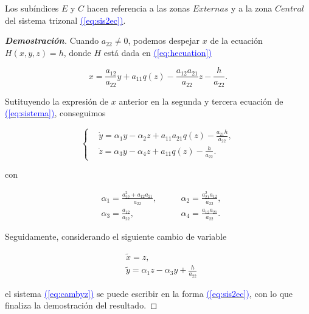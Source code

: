 \documentclass[12pt,a4paper]{report} %
\newcommand{\eref}[1]{\hyperref[#1]{\textcolor{blue}{(\ref*{#1})}}}
\newcommand{\eref}[1]{\hyperref[#1]{\textcolor{blue}{\textit{(\ref*{#1})}}}}
\begin{document}
 \vspace{0.5cm} Los subíndices $E$ y $C$ hacen referencia a las zonas $Externas$ y a la zona $Central$ del sistema trizonal \eref{eq:sis2ec}.
	
	\vspace{0.5cm}
		
	\begin{proof}[\textbf{Demostración}]
		 Cuando $a_{22}\neq0$, podemos despejar $x$ de la ecuación $H(x,y,z)=h$, donde $H$ está dada en \eref{eq:hecuation}
		
		\begin{equation}
			\label{eq:xeqn}
			x=\frac{a_{12}}{a_{22}}y+a_{11}q(z)-\frac{a_{12}a_{21}}{a_{22}}z-\frac{h}{a_{22}}.
		\end{equation}\smallskip
		
		\noindent Sutituyendo la expresión de $x$ anterior en la segunda y tercera ecuación de \eref{eq:sistema}, conseguimos
		
		\begin{equation}
			\label{eq:cambyz}
			\left\{
			\begin{aligned}
				&\dot{y}=\alpha_1y-\alpha_2z+a_{11}a_{21}q(z)-\frac{a_{21}h}{a_{22}}, \\[2mm]
				&\dot{z}=\alpha_3y-\alpha_4z+a_{11}q(z)-\frac{h}{a_{22}}.
			\end{aligned}
			\right.
		\end{equation}
		
	    \noindent con
		
		\begin{equation}
			\label{eq:alphamatriz}
			\begin{aligned}
				&\alpha_1=\frac{a_{22}^2+a_{12}a_{21}}{a_{22}}, \qquad &\alpha_2=\frac{a_{21}^2a_{12}}{a_{22}},\\[2mm]
				&\alpha_3=\frac{a_{12}}{a_{22}}, \qquad &\alpha_4=\frac{a_{12}a_{21}}{a_{22}}.
			\end{aligned}
		\end{equation}\smallskip
		
		\noindent Seguidamente, considerando el siguiente cambio de variable
		
		\begin{equation}
			\label{eq:xytilde}
			\begin{aligned}
				&\tilde{x}=z, \\[2mm]
				&\tilde{y}=\alpha_1z-\alpha_3y+\frac{h}{a_{22}}
			\end{aligned}
		\end{equation}\smallskip
		
		 \noindent el sistema \eref{eq:cambyz} se puede escribir en la forma \eref{eq:sis2ec}, con lo que finaliza la demostración del resultado.
		
	\end{proof}
	
\end{document}
